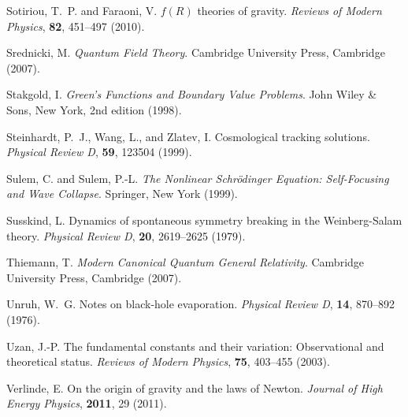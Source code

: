 \documentclass[12pt,a4paper]{article}
\begin{document}
\begin{thebibliography}{99}
		Sotiriou, T.~P. and Faraoni, V.
		\newblock $f(R)$ theories of gravity.
		\newblock \textit{Reviews of Modern Physics}, \textbf{82}, 451--497 (2010).
		\newblock {}
		
		Srednicki, M.
		\newblock \textit{Quantum Field Theory}.
		\newblock Cambridge University Press, Cambridge (2007).
		
		Stakgold, I.
		\newblock \textit{Green's Functions and Boundary Value Problems}.
		\newblock John Wiley \& Sons, New York, 2nd edition (1998).
		
		Steinhardt, P.~J., Wang, L., and Zlatev, I.
		\newblock Cosmological tracking solutions.
		\newblock \textit{Physical Review D}, \textbf{59}, 123504 (1999).
		\newblock {}
		
		Sulem, C. and Sulem, P.-L.
		\newblock \textit{The Nonlinear Schrödinger Equation: Self-Focusing and Wave Collapse}.
		\newblock Springer, New York (1999).
		
		Susskind, L.
		\newblock Dynamics of spontaneous symmetry breaking in the Weinberg-Salam theory.
		\newblock \textit{Physical Review D}, \textbf{20}, 2619--2625 (1979).
		\newblock {}
		
		Thiemann, T.
		\newblock \textit{Modern Canonical Quantum General Relativity}.
		\newblock Cambridge University Press, Cambridge (2007).
		
		Unruh, W.~G.
		\newblock Notes on black-hole evaporation.
		\newblock \textit{Physical Review D}, \textbf{14}, 870--892 (1976).
		\newblock {}
		
		Uzan, J.-P.
		\newblock The fundamental constants and their variation: Observational and theoretical status.
		\newblock \textit{Reviews of Modern Physics}, \textbf{75}, 403--455 (2003).
		\newblock {}
		
		Verlinde, E.
		\newblock On the origin of gravity and the laws of Newton.
		\newblock \textit{Journal of High Energy Physics}, \textbf{2011}, 29 (2011).
		\newblock {}
		

\end{thebibliography}
\end{document}
